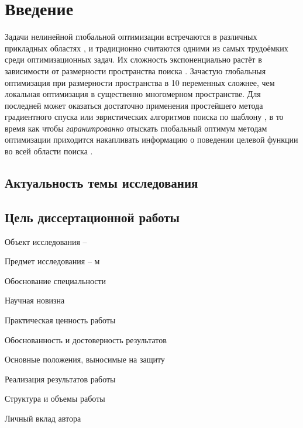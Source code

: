 \section*{Введение}


Задачи нелинейной глобальной оптимизации встречаются в различных прикладных областях \cite{Kvasov2013, Barkalov2013},
и традиционно считаются одними из самых трудоёмких среди оптимизационных задач.
Их сложность экспоненциально растёт в зависимости от размерности пространства поиска \cite{Vavasis1995}.
Зачастую глобальныя оптимизация при размерности пространства в 10 переменных сложнее,
чем локальная оптимизация в существенно многомерном пространстве.
Для последней может оказаться достаточно применения простейшего метода градиентного спуска
или эвристических алгоритмов поиска по шаблону \cite{torczon1997},
в то время как чтобы \textit{гаранитрованно} отыскать глобальный оптимум методам
оптимизации приходится накапливать информацию о поведении целевой функции во всей области поиска
\cite{Jones2009,Paulavicius2011,Evtushenko2013,Strongin2000}.





\subsection*{Актуальность темы исследования}

\subsection*{Цель диссертационной работы}


Объект исследования –

Предмет исследования – м

Обоснование специальности

Научная новизна

Практическая ценность работы

Обоснованность и достоверность результатов

Основные положения, выносимые на защиту

Реализация результатов работы

Структура и объемы работы

Личный вклад автора
